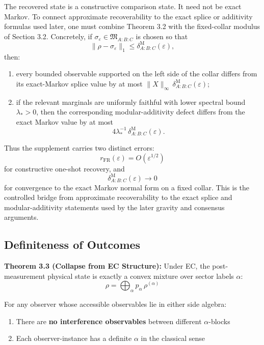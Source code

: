 The recovered state is a constructive comparison state. It need not be exact Markov. To connect approximate recoverability to the exact splice or additivity formulas used later, one must combine Theorem 3.2 with the fixed-collar modulus of Section 3.2. Concretely, if \(\sigma_\varepsilon\in\mathfrak M_{A:B:C}\) is chosen so that
\[
\|\rho-\sigma_\varepsilon\|_1
\le
\delta^{\mathrm M}_{A:B:C}(\varepsilon),
\]
then:
\begin{enumerate}
\item every bounded observable supported on the left side of the collar differs from its exact-Markov splice value by at most \(\|X\|_\infty\,\delta^{\mathrm M}_{A:B:C}(\varepsilon)\);
\item if the relevant marginals are uniformly faithful with lower spectral bound \(\lambda_\ast>0\), then the corresponding modular-additivity defect differs from the exact Markov value by at most
\[
4\lambda_\ast^{-1}\,
\delta^{\mathrm M}_{A:B:C}(\varepsilon).
\]
\end{enumerate}

Thus the supplement carries two distinct errors:
\[
r_{\mathrm{FR}}(\varepsilon)=O(\varepsilon^{1/2})
\]
for constructive one-shot recovery, and
\[
\delta^{\mathrm M}_{A:B:C}(\varepsilon)\to0
\]
for convergence to the exact Markov normal form on a fixed collar. This is the controlled bridge from approximate recoverability to the exact splice and modular-additivity statements used by the later gravity and consensus arguments.

\subsection{Definiteness of Outcomes}\label{34-definiteness-of-outcomes}

\textbf{Theorem 3.3 (Collapse from EC Structure):} Under EC, the post-measurement physical state is exactly a convex mixture over sector labels \(\alpha\): \[\rho = \bigoplus_\alpha p_\alpha \, \rho^{(\alpha)}\]

For any observer whose accessible observables lie in either side algebra:

\begin{enumerate}
\def\labelenumi{\arabic{enumi}.}
\tightlist
\item
 There are \textbf{no interference observables} between different \(\alpha\)-blocks
\item
 Each observer-instance has a definite \(\alpha\) in the classical sense
\end{enumerate}

